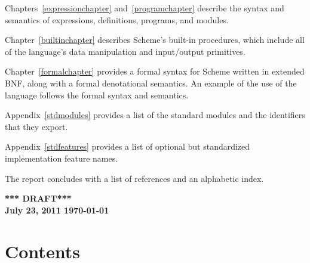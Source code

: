 \vest Chapters~\ref{expressionchapter} and~\ref{programchapter} describe
the syntax and semantics of expressions, definitions, programs, and modules.

\vest Chapter~\ref{builtinchapter} describes Scheme's built-in
procedures, which include all of the language's data manipulation and
input/output primitives.

\vest Chapter~\ref{formalchapter} provides a formal syntax for Scheme
written in extended BNF, along with a formal denotational semantics.
An example of the use of the language follows the formal syntax and
semantics.

\vest Appendix~\ref{stdmodules} provides a list of the standard modules
and the identifiers that they export.

\vest Appendix~\ref{stdfeatures} provides a list of optional but standardized
implementation feature names.


\vest The report concludes with a list of references and an
alphabetic index.


\vfill
\begin{center}
{\large \bf
*** DRAFT*** \\
July 23, 2011
\today
}\end{center}

\vfill
\eject

\chapter*{Contents}
\addvspace{3.5pt}                  %
\renewcommand{\tocshrink}{-3.5pt}  %
{\footnotesize
\tableofcontents
}

\vfill
\eject
